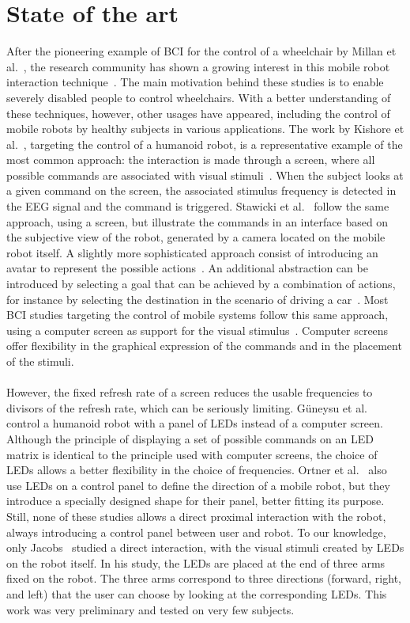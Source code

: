 \documentclass[smallextended]{svjour3}
\begin{document}
\section{State of the art}
\label{sec:soa}
After the pioneering example of BCI for the control of a wheelchair by Millan et al.~\cite{millan2004noninvasive}, the research community has shown a growing interest in this mobile robot interaction technique~\cite{Bi2013}. 
The main motivation behind these studies is to enable severely disabled people to control wheelchairs. 
With a better understanding of these techniques, however, other usages have appeared, including the control of mobile robots by healthy subjects in various applications. The work by Kishore et al.~\cite{kishore2014comparison}, targeting the control of a humanoid robot, is a representative example of the most common approach: the interaction is made through a screen, where all possible commands are associated with visual stimuli~\cite{Volosyak2009}. When the subject looks at a given command on the screen, the associated stimulus frequency is detected in the EEG signal and the command is triggered. Stawicki et al.~\cite{Stawicki2016} follow the same approach, using a screen, but illustrate the commands in an interface based on the subjective view of the robot, generated by  a camera located on the mobile robot itself. 
A slightly more sophisticated approach consist of introducing an avatar to represent the possible actions~\cite{Faller2010}. An additional abstraction can be introduced by selecting a goal that can be achieved by a combination of actions, for instance by selecting the destination in the scenario of driving a car~\cite{Fan2015}. 
Most BCI studies targeting the control of mobile systems follow this same approach, using a computer screen as support for the visual stimulus~\cite{Bi2013}. Computer screens offer flexibility in the graphical expression of the commands and in the placement of the stimuli. \\
\\
However, the fixed refresh rate of a screen reduces the usable frequencies to divisors of the refresh rate, which can be seriously limiting. G{\"{u}}neysu et al.~\cite{Guneysu2013} control a humanoid robot with a panel of LEDs instead of a computer screen. Although the principle of displaying a set of possible commands on an LED matrix is identical to the principle used with computer screens, the choice of LEDs allows a better flexibility in the choice of frequencies. Ortner et al.~\cite{Ortner2010} also use LEDs on a control panel to define the direction of a mobile robot, but they introduce a specially designed shape for their panel, better fitting its purpose. Still, none of these studies allows a direct proximal interaction with the robot, always introducing a control panel between user and robot. To our knowledge, only Jacobs~\cite{Jacobs2013} studied a direct interaction, with the visual stimuli created by LEDs on the robot itself. In his study, the LEDs are placed at the end of three arms fixed on the robot. The three arms correspond to three directions (forward, right, and left) that the user can choose by looking at the corresponding LEDs. This work was very preliminary and tested on very few subjects.\\
\end{document}
